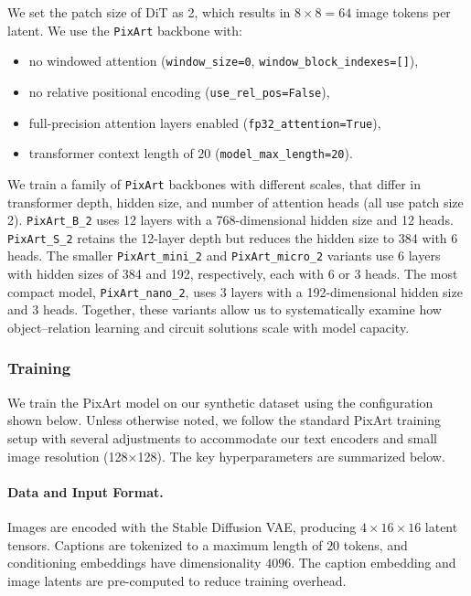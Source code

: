 \documentclass[10pt,twocolumn,letterpaper]{article}
\begin{document}
We set the patch size of DiT as 2, which results in $8\times8=64$ image tokens per latent. 
We use the \texttt{PixArt} backbone with:
\begin{itemize}
    \item no windowed attention (\texttt{window\_size=0}, \texttt{window\_block\_indexes=[]}),
    \item no relative positional encoding (\texttt{use\_rel\_pos=False}),
    \item full-precision attention layers enabled (\texttt{fp32\_attention=True}),
    \item transformer context length of $20$ (\texttt{model\_max\_length=20}).
\end{itemize}
We train a family of \texttt{PixArt} backbones with different scales, that differ in transformer depth, hidden size, and number of attention heads (all use patch size 2). \texttt{PixArt\_B\_2} uses 12 layers with a 768-dimensional hidden size and 12 heads. \texttt{PixArt\_S\_2} retains the 12-layer depth but reduces the hidden size to 384 with 6 heads. The smaller \texttt{PixArt\_mini\_2} and \texttt{PixArt\_micro\_2} variants use 6 layers with hidden sizes of 384 and 192, respectively, each with 6 or 3 heads. The most compact model, \texttt{PixArt\_nano\_2}, uses 3 layers with a 192-dimensional hidden size and 3 heads. Together, these variants allow us to systematically examine how object–relation learning and circuit solutions scale with model capacity.



\subsubsection{Training}

We train the PixArt model on our synthetic dataset using the configuration shown below. Unless otherwise noted, we follow the standard PixArt training setup with several adjustments to accommodate our text encoders and small image resolution (128×128). The key hyperparameters are summarized below.

\paragraph{Data and Input Format.}
Images are encoded with the Stable Diffusion VAE, producing $4\times16\times16$ latent tensors. 
Captions are tokenized to a maximum length of $20$ tokens, and conditioning embeddings have dimensionality $4096$. 
The caption embedding and image latents are pre-computed to reduce training overhead.
\end{document}
